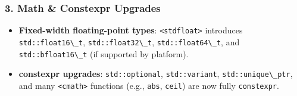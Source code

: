\hypertarget{math-constexpr-upgrades}{%
\subsubsection{3. Math \& Constexpr
Upgrades}\label{math-constexpr-upgrades}}

\begin{itemize}
\tightlist
\item
  \textbf{Fixed-width floating-point types}:
  \passthrough{\lstinline!<stdfloat>!} introduces
  \passthrough{\lstinline!std::float16\_t!},
  \passthrough{\lstinline!std::float32\_t!},
  \passthrough{\lstinline!std::float64\_t!}, and
  \passthrough{\lstinline!std::bfloat16\_t!} (if supported by platform).
\item
  \textbf{constexpr upgrades}: \passthrough{\lstinline!std::optional!},
  \passthrough{\lstinline!std::variant!},
  \passthrough{\lstinline!std::unique\_ptr!}, and many
  \passthrough{\lstinline!<cmath>!} functions (e.g.,
  \passthrough{\lstinline!abs!}, \passthrough{\lstinline!ceil!}) are now
  fully \passthrough{\lstinline!constexpr!}.
\end{itemize}
